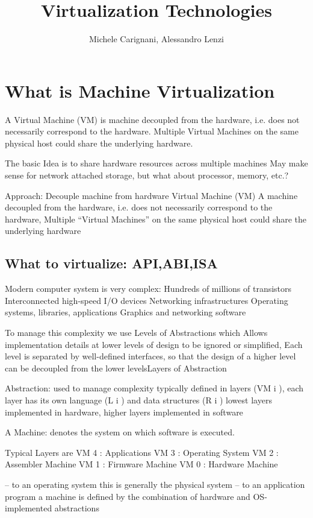 \documentclass[10pt]{article}
\title{Virtualization Technologies}
\author{Michele Carignani, Alessandro Lenzi}
\begin{document}
\maketitle
\tableofcontents

\section{What is Machine Virtualization}

A Virtual Machine (VM) is  machine decoupled from the hardware, i.e. does not necessarily correspond to the hardware. Multiple Virtual Machines on the same physical host could share the underlying hardware.

The basic Idea is to share hardware resources across multiple machines May make sense for network attached storage, but what about processor, memory, etc.?

Approach: Decouple machine from hardware Virtual Machine (VM) A machine decoupled from the hardware, i.e. does not necessarily correspond to the
hardware, Multiple “Virtual Machines” on the same physical host could share the underlying hardware


\subsection{What to virtualize: API,ABI,ISA}

Modern computer system is very complex: 
Hundreds of millions of transistors
Interconnected high-speed I/O devices
Networking infrastructures
Operating systems, libraries, applications
Graphics and networking software


To manage this complexity we use Levels of Abstractions which
Allows implementation details at lower levels of design to be ignored or simplified,
Each level is separated by well-defined interfaces, so
that the design of a higher level can be decoupled
from the lower levelsLayers of Abstraction


Abstraction: used to manage complexity typically defined in layers (VM i ), each layer has its own language (L i ) and data structures (R i )   lowest layers implemented in hardware, higher layers implemented in
software

A Machine: denotes the system on which software is executed.

Typical Layers are 
VM 4 : Applications 
VM 3 : Operating System
VM 2 : Assembler Machine
VM 1 : Firmware Machine
VM 0 : Hardware Machine

–  to an operating system this is generally the physical system
–  to an application program a machine is defined by the combination of hardware and OS-implemented abstractions
 
\end{document}
